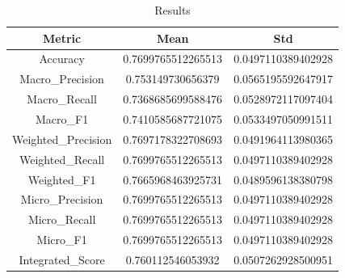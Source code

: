 \begin{table}[htbp]
\centering
\caption{Results}
\label{tab:csv}
\small
\setlength{\tabcolsep}{4pt}
\begin{tabular}{|c|c|c|}
\hline
Metric & Mean & Std \\
\hline
Accuracy & 0.7699765512265513 & 0.0497110389402928 \\
Macro_Precision & 0.753149730656379 & 0.0565195592647917 \\
Macro_Recall & 0.7368685699588476 & 0.0528972117097404 \\
Macro_F1 & 0.7410585687721075 & 0.0533497050991511 \\
Weighted_Precision & 0.7697178322708693 & 0.0491964113980365 \\
Weighted_Recall & 0.7699765512265513 & 0.0497110389402928 \\
Weighted_F1 & 0.7665968463925731 & 0.0489596138380798 \\
Micro_Precision & 0.7699765512265513 & 0.0497110389402928 \\
Micro_Recall & 0.7699765512265513 & 0.0497110389402928 \\
Micro_F1 & 0.7699765512265513 & 0.0497110389402928 \\
Integrated_Score & 0.760112546053932 & 0.0507262928500951 \\
\hline
\end{tabular}
\end{table}